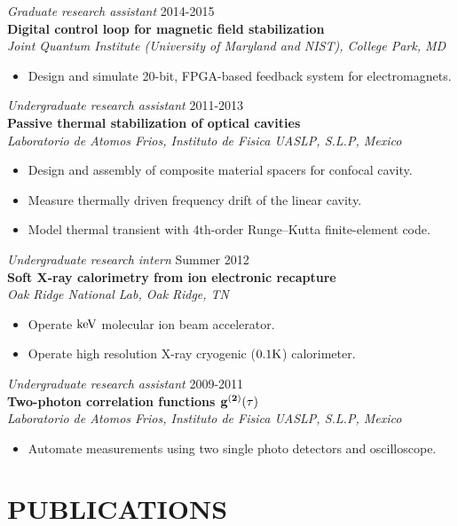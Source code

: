 \documentclass[margin]{res} %
\begin{document}
\begin{resume}
{\sl Graduate research assistant} \hfill 2014-2015 \\
{\bf Digital control loop for magnetic field stabilization}\\
{\it Joint Quantum Institute (University of Maryland and NIST), College Park, MD}
\begin{itemize} \itemsep -2pt
\item Design and simulate 20-bit, FPGA-based feedback system for electromagnets.
\end{itemize} 

{\sl Undergraduate research assistant} \hfill 2011-2013 \\
{\bf Passive thermal stabilization of optical cavities}\\
{\it Laboratorio de Atomos Frios, Instituto de Fisica UASLP, S.L.P, Mexico}
\begin{itemize} \itemsep -2pt
\item Design and assembly of composite material spacers for confocal cavity.
\item Measure thermally driven frequency drift of the linear cavity. 
\item Model thermal transient with 4th-order Runge--Kutta finite-element code.
\end{itemize}
 
{\sl Undergraduate research intern} \hfill Summer 2012 \\
{\bf Soft X-ray calorimetry from ion electronic recapture}\\
{\it Oak Ridge National Lab, Oak Ridge, TN}
\begin{itemize} \itemsep -2pt
\item Operate ${{\rm keV}}$ molecular ion beam accelerator.
\item Operate high resolution X-ray cryogenic (${0.1 {\rm K}}$) calorimeter.
\end{itemize}

{\sl Undergraduate research assistant} \hfill 2009-2011 \\
{\bf Two-photon correlation functions $\bf g^{(2)}(\tau)$}\\
{\it Laboratorio de Atomos Frios, Instituto de Fisica UASLP, S.L.P, Mexico}
\begin{itemize} \itemsep -2pt
\item Automate measurements using two single photo detectors and oscilloscope.
\end{itemize}
 
\end{resume}
\section{PUBLICATIONS}
\printbibliography[heading=none]
\end{document}
